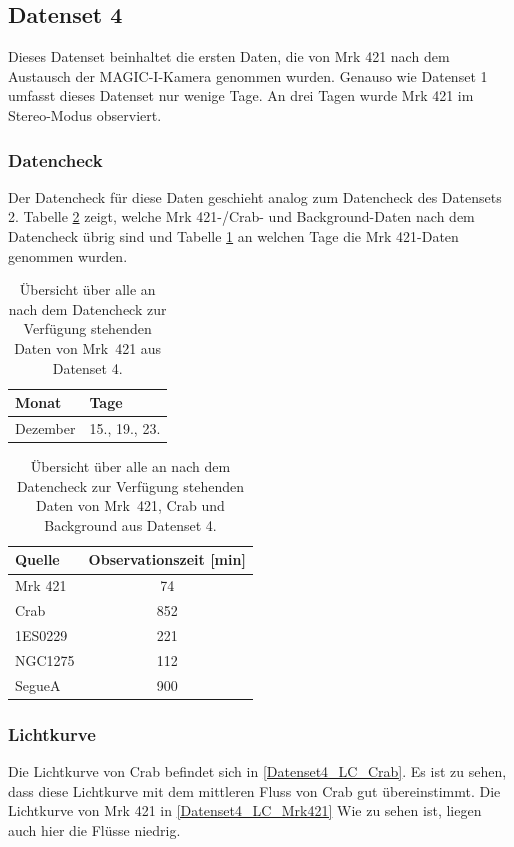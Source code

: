 \subsection{Datenset 4}
\label{subsec:Datenset_4}
Dieses Datenset beinhaltet die ersten Daten, die von Mrk 421 nach dem Austausch der MAGIC-I-Kamera genommen wurden. 
Genauso wie Datenset 1 umfasst dieses Datenset nur wenige Tage. 
An drei Tagen wurde Mrk 421 im Stereo-Modus observiert. 

\subsubsection{Datencheck}
Der Datencheck für diese Daten geschieht analog zum Datencheck des Datensets 2. 
Tabelle \ref{tab:Datenset4} zeigt, welche Mrk 421-/Crab- und Background-Daten nach dem Datencheck übrig sind und Tabelle \ref{tab:Datenset4-Mrk421} an welchen Tage die Mrk 421-Daten genommen wurden.

\begin{table}[!h]
\centering
\caption{Übersicht über alle an nach dem Datencheck zur Verfügung stehenden Daten von Mrk~421 aus Datenset 4.}
\label{tab:Datenset4-Mrk421}
\begin{tabular}{ll}
  \toprule
  Monat & Tage\\
  \midrule
  \midrule
Dezember & 15., 19., 23.\\
  \bottomrule
\end{tabular}
\end{table}


\begin{table}[!h]
\centering
\caption{Übersicht über alle an nach dem Datencheck zur Verfügung stehenden Daten von Mrk~421, Crab und Background aus Datenset 4.}
\label{tab:Datenset4}
\begin{tabular}{lc}
  \toprule
  Quelle & Observationszeit [min]\\
  \midrule
  \midrule
  Mrk 421 & 74\\
  \midrule
  Crab & 852\\
  \midrule
  1ES0229 & 221 \\
  NGC1275 & 112 \\
  SegueA & 900  \\
  \bottomrule
  \bottomrule
\end{tabular}
\end{table}

\subsubsection{Lichtkurve}
Die Lichtkurve von Crab befindet sich in \autoref{Datenset4_LC_Crab}. 
Es ist zu sehen, dass diese Lichtkurve mit dem mittleren Fluss von Crab gut übereinstimmt.
Die Lichtkurve von Mrk 421 in \autoref{Datenset4_LC_Mrk421} 
Wie zu sehen ist, liegen auch hier die Flüsse niedrig.

